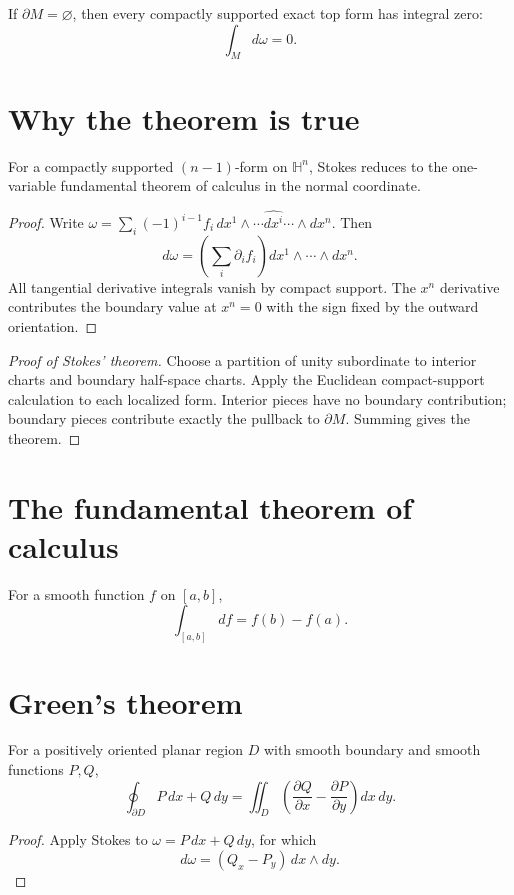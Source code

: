 \begin{remark}\label{rem:vii11-boundaryless}
If $\partial M=\varnothing$, then every compactly supported exact top form has integral zero:
\[
\int_Md\omega=0.
\]
\end{remark}

\section{Why the theorem is true}
\begin{proposition}\label{prop:vii11-local-halfspace}
For a compactly supported $(n-1)$-form on $\mathbb H^n$, Stokes reduces to the one-variable fundamental theorem of calculus in the normal coordinate.
\end{proposition}
\begin{proof}
Write $\omega=\sum_i(-1)^{i-1}f_i\,dx^1\wedge\cdots\widehat{dx^i}\cdots\wedge dx^n$. Then
\[
d\omega=\left(\sum_i\partial_i f_i\right)dx^1\wedge\cdots\wedge dx^n.
\]
All tangential derivative integrals vanish by compact support. The $x^n$ derivative contributes the boundary value at $x^n=0$ with the sign fixed by the outward orientation.
\end{proof}

\begin{proof}[Proof of Stokes' theorem]
Choose a partition of unity subordinate to interior charts and boundary half-space charts. Apply the Euclidean compact-support calculation to each localized form. Interior pieces have no boundary contribution; boundary pieces contribute exactly the pullback to $\partial M$. Summing gives the theorem.
\end{proof}

\section{The fundamental theorem of calculus}
\begin{corollary}\label{cor:vii11-ftc}
For a smooth function $f$ on $[a,b]$,
\[
\int_{[a,b]}df=f(b)-f(a).
\]
\end{corollary}

\section{Green's theorem}
\begin{corollary}[Green]\label{cor:vii11-green}
For a positively oriented planar region $D$ with smooth boundary and smooth functions $P,Q$,
\[
\oint_{\partial D}P\,dx+Q\,dy
=\iint_D\left(\frac{\partial Q}{\partial x}-\frac{\partial P}{\partial y}\right)dx\,dy.
\]
\end{corollary}
\begin{proof}
Apply Stokes to $\omega=P\,dx+Q\,dy$, for which
\[
d\omega=(Q_x-P_y)\,dx\wedge dy.
\]
\end{proof}

